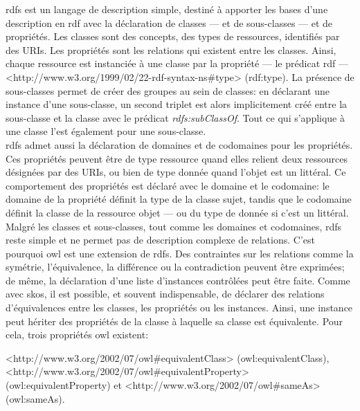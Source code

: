 \ac{rdfs} est un langage de description simple, destiné à apporter les bases d'une description en \ac{rdf} avec la déclaration de classes --- et de sous-classes --- et de propriétés. Les classes sont des concepts, des types de ressources, identifiés par des URIs. Les propriétés sont les relations qui existent entre les classes. Ainsi, chaque ressource est instanciée à une classe par la propriété --- le prédicat \ac{rdf} --- <http://www.w3.org/1999/02/22-rdf-syntax-ns\#type> (rdf:type). La présence de sous-classes permet de créer des groupes au sein de classes: en déclarant une instance d'une sous-classe, un second triplet est alors implicitement créé entre la sous-classe et la classe avec le prédicat \textit{rdfs:subClassOf}. Tout ce qui s'applique à une classe l'est également pour une sous-classe.\\

\ac{rdfs} admet aussi la déclaration de domaines et de codomaines pour les propriétés. Ces propriétés peuvent être de type ressource quand elles relient deux ressources désignées par des URIs, ou bien de type donnée quand l'objet est un littéral. Ce comportement des propriétés est déclaré avec le domaine et le codomaine: le domaine de la propriété définit la type de la classe sujet, tandis que le codomaine définit la classe de la ressource objet --- ou du type de donnée si c'est un littéral.\\

Malgré les classes et sous-classes, tout comme les domaines et codomaines, \ac{rdfs} reste simple et ne permet pas de description complexe de relations. C'est pourquoi \ac{owl} est une extension de \ac{rdfs}. Des contraintes sur les relations comme la symétrie, l'équivalence, la différence ou la contradiction peuvent être exprimées; de même, la déclaration d'une liste d'instances contrôlées peut être faite. Comme avec \ac{skos}, il est possible, et souvent indispensable, de déclarer des relations d'équivalences entre les classes, les propriétés ou les instances. Ainsi, une instance peut hériter des propriétés de la classe à laquelle sa classe est équivalente. Pour cela, trois propriétés \ac{owl} existent: 

\noindent<http://www.w3.org/2002/07/owl\#equivalentClass> (owl:equivalentClass), <http://www.w3.org/2002/07/owl\#equivalentProperty> (owl:equivalentProperty) et <http://www.w3.org/2002/07/owl\#sameAs> (owl:sameAs).

